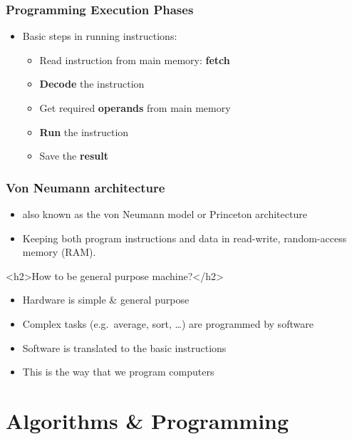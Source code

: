 \documentclass{../c-lecture}
\begin{document}
\begin{frame}
  \frametitle{Programming Execution Phases}
  \begin{itemize}
    \item Basic steps in running instructions:
    \begin{itemize}
      \item
        Read instruction from main memory: \textbf{\color{Green} fetch}
      \item \textbf{\color{Orange} Decode} the instruction
      \item
        Get required \textbf{\color{Blue} operands} from main memory
      \item \textbf{\color{Red} Run} the instruction
      \item Save the \textbf{\color{Cyan} result}
    \end{itemize}
  \end{itemize}
\end{frame}

\begin{frame}
  \frametitle{Von Neumann architecture}
  \begin{itemize}
    \item also known as the von Neumann model or Princeton architecture
    \item
      Keeping both program instructions and data in read-write, random-access
      memory (RAM).
  \end{itemize}
\end{frame}

\begin{frame}
  <h2>How to be general purpose machine?</h2>
  \begin{itemize}
    \item Hardware is simple \& general purpose
    \item Complex tasks (e.g.\ average, sort, \ldots) are programmed by software
    \item Software is translated to the basic instructions
    \item
      This is the way that we
      {\color{Orange} program} computers
  \end{itemize}
\end{frame}

\section{Algorithms \& Programming}
\end{document}
